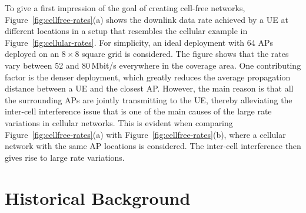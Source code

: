 To give a first impression of the goal of creating cell-free networks, Figure~\ref{fig:cellfree-rates}(a) shows the downlink data rate achieved by a \gls{UE} at different locations in a setup that resembles the cellular example in Figure~\ref{fig:cellular-rates}. For simplicity, an ideal deployment with 64 \glspl{AP} deployed on an $8 \times 8$ square grid is considered.
The figure shows that the rates vary between 52 and 80\,Mbit/s everywhere in the coverage area. One contributing factor is the denser deployment, which greatly reduces the average propagation distance between a \gls{UE} and the closest \gls{AP}.
 However, the main reason is that all the surrounding \glspl{AP} are jointly transmitting to the \gls{UE}, thereby alleviating the inter-cell interference issue that is one of the main causes of the large rate variations in cellular networks.
This is evident when comparing Figure~\ref{fig:cellfree-rates}(a) with Figure~\ref{fig:cellfree-rates}(b), where a cellular network with the same AP locations is considered. The inter-cell interference then gives rise to large rate variations. 





\section{Historical Background}\label{sec:historical-background}

